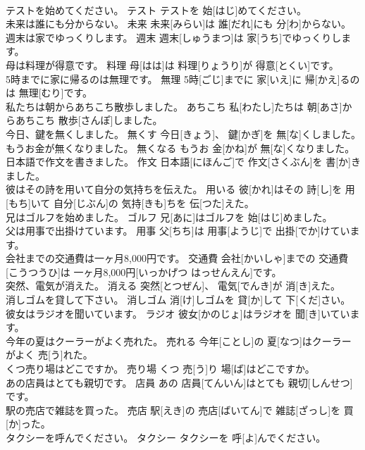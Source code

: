 \documentclass[8pt]{extreport}
\begin{document}
\begin{CJK}{UTF8}{min}
\\	テストを始めてください。	テスト	テストを 始[はじ]めてください。	
\\	未来は誰にも分からない。	未来	未来[みらい]は 誰[だれ]にも 分[わ]からない。	
\\	週末は家でゆっくりします。	週末	週末[しゅうまつ]は 家[うち]でゆっくりします。	
\\	母は料理が得意です。	料理	母[はは]は 料理[りょうり]が 得意[とくい]です。	
\\	5時までに家に帰るのは無理です。	無理	5時[ごじ]までに 家[いえ]に 帰[かえ]るのは 無理[むり]です。	
\\	私たちは朝からあちこち散歩しました。	あちこち	私[わたし]たちは 朝[あさ]からあちこち 散歩[さんぽ]しました。	
\\	今日、鍵を無くしました。	無くす	今日[きょう]、 鍵[かぎ]を 無[な]くしました。	
\\	もうお金が無くなりました。	無くなる	もうお 金[かね]が 無[な]くなりました。	
\\	日本語で作文を書きました。	作文	日本語[にほんご]で 作文[さくぶん]を 書[か]きました。	
\\	彼はその詩を用いて自分の気持ちを伝えた。	用いる	彼[かれ]はその 詩[し]を 用[もち]いて 自分[じぶん]の 気持[きも]ちを 伝[つた]えた。	
\\	兄はゴルフを始めました。	ゴルフ	兄[あに]はゴルフを 始[はじ]めました。	
\\	父は用事で出掛けています。	用事	父[ちち]は 用事[ようじ]で 出掛[でか]けています。	
\\	会社までの交通費は一ヶ月8,000円です。	交通費	会社[かいしゃ]までの 交通費[こうつうひ]は 一ヶ月8,000円[いっかげつ はっせんえん]です。	
\\	突然、電気が消えた。	消える	突然[とつぜん]、 電気[でんき]が 消[き]えた。	
\\	消しゴムを貸して下さい。	消しゴム	消[け]しゴムを 貸[か]して 下[くだ]さい。	
\\	彼女はラジオを聞いています。	ラジオ	彼女[かのじょ]はラジオを 聞[き]いています。	
\\	今年の夏はクーラーがよく売れた。	売れる	今年[ことし]の 夏[なつ]はクーラーがよく 売[う]れた。	
\\	くつ売り場はどこですか。	売り場	くつ 売[う]り 場[ば]はどこですか。	
\\	あの店員はとても親切です。	店員	あの 店員[てんいん]はとても 親切[しんせつ]です。	
\\	駅の売店で雑誌を買った。	売店	駅[えき]の 売店[ばいてん]で 雑誌[ざっし]を 買[か]った。	
\\	タクシーを呼んでください。	タクシー	タクシーを 呼[よ]んでください。	

\end{CJK}
\end{document}
